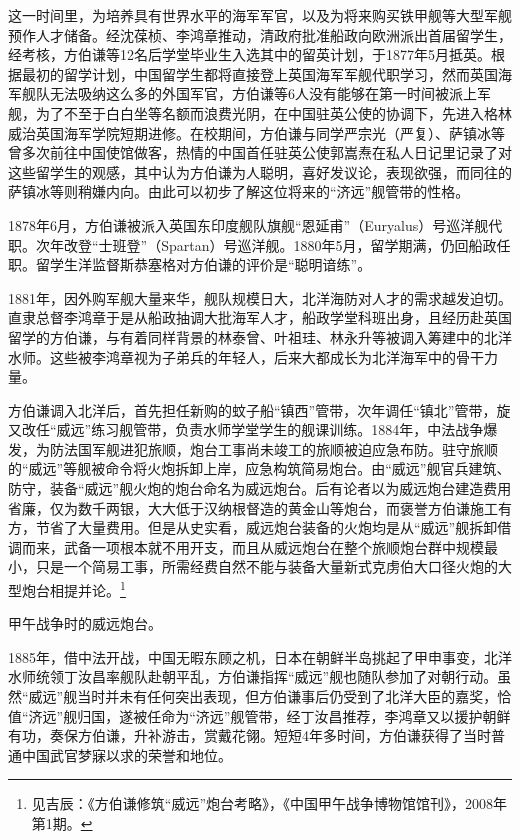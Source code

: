 \documentclass[12pt,UTF8]{ctexbook}
\begin{document}
这一时间里，为培养具有世界水平的海军军官，以及为将来购买铁甲舰等大型军舰预作人才储备。经沈葆桢、李鸿章推动，清政府批准船政向欧洲派出首届留学生，经考核，方伯谦等12名后学堂毕业生入选其中的留英计划，于1877年5月抵英。根据最初的留学计划，中国留学生都将直接登上英国海军军舰代职学习，然而英国海军舰队无法吸纳这么多的外国军官，方伯谦等6人没有能够在第一时间被派上军舰，为了不至于白白坐等名额而浪费光阴，在中国驻英公使的协调下，先进入格林威治英国海军学院短期进修。在校期间，方伯谦与同学严宗光（严复）、萨镇冰等曾多次前往中国使馆做客，热情的中国首任驻英公使郭嵩焘在私人日记里记录了对这些留学生的观感，其中认为方伯谦为人聪明，喜好发议论，表现欲强，而同往的萨镇冰等则稍嫌内向。由此可以初步了解这位将来的“济远”舰管带的性格。

1878年6月，方伯谦被派入英国东印度舰队旗舰“恩延甫”（Euryalus）号巡洋舰代职。次年改登“士班登”（Spartan）号巡洋舰。1880年5月，留学期满，仍回船政任职。留学生洋监督斯恭塞格对方伯谦的评价是“聪明谙练”。

1881年，因外购军舰大量来华，舰队规模日大，北洋海防对人才的需求越发迫切。直隶总督李鸿章于是从船政抽调大批海军人才，船政学堂科班出身，且经历赴英国留学的方伯谦，与有着同样背景的林泰曾、叶祖珪、林永升等被调入筹建中的北洋水师。这些被李鸿章视为子弟兵的年轻人，后来大都成长为北洋海军中的骨干力量。

方伯谦调入北洋后，首先担任新购的蚊子船“镇西”管带，次年调任“镇北”管带，旋又改任“威远”练习舰管带，负责水师学堂学生的舰课训练。1884年，中法战争爆发，为防法国军舰进犯旅顺，炮台工事尚未竣工的旅顺被迫应急布防。驻守旅顺的“威远”等舰被命令将火炮拆卸上岸，应急构筑简易炮台。由“威远”舰官兵建筑、防守，装备“威远”舰火炮的炮台命名为威远炮台。后有论者以为威远炮台建造费用省廉，仅为数千两银，大大低于汉纳根督造的黄金山等炮台，而褒誉方伯谦施工有方，节省了大量费用。但是从史实看，威远炮台装备的火炮均是从“威远”舰拆卸借调而来，武备一项根本就不用开支，而且从威远炮台在整个旅顺炮台群中规模最小，只是一个简易工事，所需经费自然不能与装备大量新式克虏伯大口径火炮的大型炮台相提并论。\footnote{见吉辰：《方伯谦修筑“威远”炮台考略》，《中国甲午战争博物馆馆刊》，2008年第1期。}

甲午战争时的威远炮台。

1885年，借中法开战，中国无暇东顾之机，日本在朝鲜半岛挑起了甲申事变，北洋水师统领丁汝昌率舰队赴朝平乱，方伯谦指挥“威远”舰也随队参加了对朝行动。虽然“威远”舰当时并未有任何突出表现，但方伯谦事后仍受到了北洋大臣的嘉奖，恰值“济远”舰归国，遂被任命为“济远”舰管带，经丁汝昌推荐，李鸿章又以援护朝鲜有功，奏保方伯谦，升补游击，赏戴花翎。短短4年多时间，方伯谦获得了当时普通中国武官梦寐以求的荣誉和地位。
\end{document}
